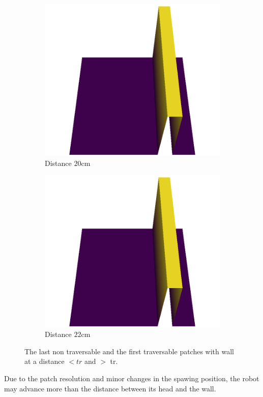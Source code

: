 \begin{figure}[H]
\begin{subfigure}[b]{0.33\textwidth}
    \end{subfigure}   \\
    \begin{subfigure}[b]{0.33\textwidth}
        \includegraphics[width=\linewidth]{../img/5/custom_patches/walls_front/1-3d.png}
        \caption{Distance  $20$cm}
    \end{subfigure}   
    \begin{subfigure}[b]{0.33\textwidth}
        \includegraphics[width=\linewidth]{../img/5/custom_patches/walls_front/1-3d.png}
        \caption{Distance $22$cm}
    \end{subfigure}   
    \caption{The last non traversable and the first traversable patches with wall at a distance $ < tr$ and $ > $ tr.}
\end{figure}
Due to the patch resolution and minor changes in the spawing position, the robot may advance more than the distance between its head and the wall. 

